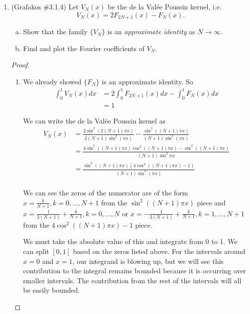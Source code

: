 \documentclass[a4paper]{article}
\begin{document}
\begin{enumerate}
\item  (Grafakos \#3.1.4) Let $V_N (x)$ be the de la Val\'{e}e Poussin   kernel, i.e. $$ V_N (x) = 2 F_{2N+1} (x) - F_N (x). $$

\begin{enumerate}[(a)]
\item Show that the family $\{ V_N \}$ is an {\it{approximate identity}} as $N\rightarrow \infty$.
\item Find and plot the Fourier coefficients of $V_N$.
\end{enumerate}

  \begin{proof}

    \begin{enumerate}

    \item

    We already showed $\{F_N\}$ is an approximate identity. So
    \begin{align*}
      \int_{0}^{1} V_N(x) dx &= 2 \int_{0}^{1} F_{2N+1}(x) dx - \int_{0}^{1} F_N(x)dx \\
      &= 1
    \end{align*}

    We can write the de la Val\'{e}e Poussin kernel as
    \begin{align*}
      V_N(x) &= \frac{2 \sin^2(2(N+1) \pi x)}{2(N+1) \sin^2 (\pi x)} - \frac{\sin^2\left( (N+1) \pi x \right)}{(N+1) \sin^2 ( \pi x)} \\
      &= \frac{4 \sin^2 \left(  (N+1) \pi x \right) \cos^2 \left( (N+1) \pi x \right) - \sin^2 \left( (N+1) \pi x \right)}{(N+1) \sin^2 \pi x} \\
      &= \frac{ \sin^2 \left( (N+1) \pi x \right) \left( 4 \cos^2 \left( (N+1) \pi x \right) - 1\right)}{(N+1) \sin^2 (\pi x)} \\
    \end{align*}

    We can see the zeros of the numerator are of the form $x = \frac{k}{N+1}, {k = 0, \dots, N+1}$ from the $\sin^2 \left( (N+1) \pi x \right)$ piece
    and $x = \frac{1}{3(N+1)} + \frac{k}{N+1}, {k = 0, \dots, N}$ or $x = - \frac{1}{3(N+1)} + \frac{k}{N+1}, {k = 1,\dots, N+1}$ from the $4 \cos^2
    \left( (N+1) \pi x \right) - 1$ piece.

    We must take the absolute value of this and integrate from 0 to 1. We can split $[0,1]$ based on the zeros listed above. For the intervals around
    $x = 0$ and $x = 1$, our integrand is blowing up, but we will see this contribution to the integral remains bounded because it is occurring over
    smaller intervals. The contribution from the rest of the intervals will all be easily bounded.


\end{enumerate}
\end{proof}
\end{enumerate}
\end{document}
